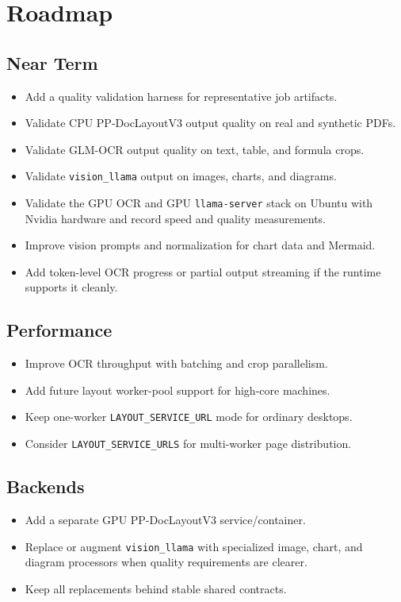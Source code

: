 \documentclass[11pt,a4paper]{article}
\begin{document}
\section{Roadmap}

\subsection{Near Term}

\begin{itemize}[leftmargin=1.2cm]
\item Add a quality validation harness for representative job artifacts.
\item Validate CPU PP-DocLayoutV3 output quality on real and synthetic PDFs.
\item Validate GLM-OCR output quality on text, table, and formula crops.
\item Validate \texttt{vision\_llama} output on images, charts, and diagrams.
\item Validate the GPU OCR and GPU \texttt{llama-server} stack on Ubuntu with
  Nvidia hardware and record speed and quality measurements.
\item Improve vision prompts and normalization for chart data and Mermaid.
\item Add token-level OCR progress or partial output streaming if the runtime
  supports it cleanly.
\end{itemize}

\subsection{Performance}

\begin{itemize}[leftmargin=1.2cm]
\item Improve OCR throughput with batching and crop parallelism.
\item Add future layout worker-pool support for high-core machines.
\item Keep one-worker \texttt{LAYOUT\_SERVICE\_URL} mode for ordinary desktops.
\item Consider \texttt{LAYOUT\_SERVICE\_URLS} for multi-worker page distribution.
\end{itemize}

\subsection{Backends}

\begin{itemize}[leftmargin=1.2cm]
\item Add a separate GPU PP-DocLayoutV3 service/container.
\item Replace or augment \texttt{vision\_llama} with specialized image, chart,
  and diagram processors when quality requirements are clearer.
\item Keep all replacements behind stable shared contracts.
\end{itemize}
\end{document}
